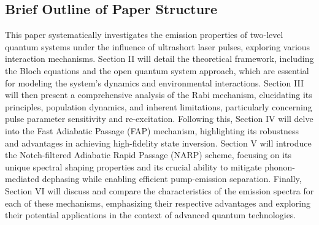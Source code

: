 \documentclass{article}
\begin{document}
\subsection{Brief Outline of Paper Structure}
This paper systematically investigates the emission properties of two-level quantum systems under the influence of ultrashort laser pulses, exploring various interaction mechanisms. Section II will detail the theoretical framework, including the Bloch equations and the open quantum system approach, which are essential for modeling the system's dynamics and environmental interactions. Section III will then present a comprehensive analysis of the Rabi mechanism, elucidating its principles, population dynamics, and inherent limitations, particularly concerning pulse parameter sensitivity and re-excitation. Following this, Section IV will delve into the Fast Adiabatic Passage (FAP) mechanism, highlighting its robustness and advantages in achieving high-fidelity state inversion. Section V will introduce the Notch-filtered Adiabatic Rapid Passage (NARP) scheme, focusing on its unique spectral shaping properties and its crucial ability to mitigate phonon-mediated dephasing while enabling efficient pump-emission separation. Finally, Section VI will discuss and compare the characteristics of the emission spectra for each of these mechanisms, emphasizing their respective advantages and exploring their potential applications in the context of advanced quantum technologies.


\end{document}
